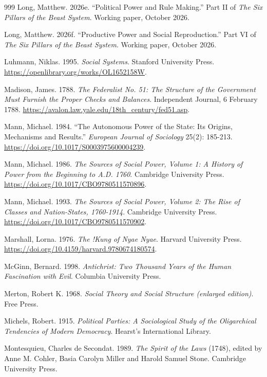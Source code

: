 \documentclass[11pt,letterpaper]{article}
\theoremstyle{definition}
\theoremstyle{remark}
\begin{document}
\begin{small}
\begin{thebibliography}{999}
Long, Matthew. 2026e. ``Political Power and Rule Making.'' Part II of \emph{The Six Pillars of the Beast System}. Working paper, October 2026.

Long, Matthew. 2026f. ``Productive Power and Social Reproduction.'' Part VI of \emph{The Six Pillars of the Beast System}. Working paper, October 2026.

Luhmann, Niklas. 1995. \emph{Social Systems}. Stanford University Press. \url{https://openlibrary.org/works/OL1652158W}.

Madison, James. 1788. \emph{The Federalist No. 51: The Structure of the Government Must Furnish the Proper Checks and Balances}. Independent Journal, 6 February 1788. \url{https://avalon.law.yale.edu/18th_century/fed51.asp}.

Mann, Michael. 1984. ``The Autonomous Power of the State: Its Origins, Mechanisms and Results.'' \emph{European Journal of Sociology} 25(2): 185-213. \url{https://doi.org/10.1017/S0003975600004239}.

Mann, Michael. 1986. \emph{The Sources of Social Power, Volume 1: A History of Power from the Beginning to A.D. 1760}. Cambridge University Press. \url{https://doi.org/10.1017/CBO9780511570896}.

Mann, Michael. 1993. \emph{The Sources of Social Power, Volume 2: The Rise of Classes and Nation-States, 1760-1914}. Cambridge University Press. \url{https://doi.org/10.1017/CBO9780511570902}.

Marshall, Lorna. 1976. \emph{The !Kung of Nyae Nyae}. Harvard University Press. \url{https://doi.org/10.4159/harvard.9780674180574}.

McGinn, Bernard. 1998. \emph{Antichrist: Two Thousand Years of the Human Fascination with Evil}. Columbia University Press.

Merton, Robert K. 1968. \emph{Social Theory and Social Structure (enlarged edition)}. Free Press.

Michels, Robert. 1915. \emph{Political Parties: A Sociological Study of the Oligarchical Tendencies of Modern Democracy}. Hearst's International Library.

Montesquieu, Charles de Secondat. 1989. \emph{The Spirit of the Laws} (1748), edited by Anne M. Cohler, Basia Carolyn Miller and Harold Samuel Stone. Cambridge University Press.


\end{thebibliography}
\end{small}
\end{document}

